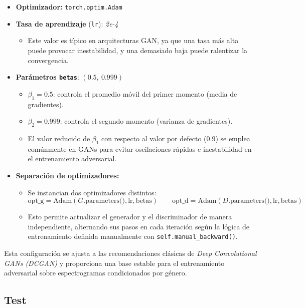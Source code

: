\begin{itemize}
    \item \textbf{Optimizador:} \texttt{torch.optim.Adam}
    \item \textbf{Tasa de aprendizaje} (\texttt{lr}): \textit{2e-4}
    \begin{itemize}
        \item Este valor es típico en arquitecturas GAN, ya que una tasa más alta puede provocar inestabilidad, y una demasiado baja puede ralentizar la convergencia.
    \end{itemize}
    \item \textbf{Parámetros \texttt{betas}}: $(0.5,\ 0.999)$
    \begin{itemize}
        \item $\beta_1 = 0.5$: controla el promedio móvil del primer momento (media de gradientes).
        \item $\beta_2 = 0.999$: controla el segundo momento (varianza de gradientes).
        \item El valor reducido de $\beta_1$ con respecto al valor por defecto (0.9) se emplea comúnmente en GANs para evitar oscilaciones rápidas e inestabilidad en el entrenamiento adversarial.
    \end{itemize}
    \item \textbf{Separación de optimizadores:}
    \begin{itemize}
        \item Se instancian dos optimizadores distintos:
        \[
        \text{opt\_g} = \text{Adam}(G.\text{parameters()}, \text{lr}, \text{betas})
        \qquad
        \text{opt\_d} = \text{Adam}(D.\text{parameters()}, \text{lr}, \text{betas})
        \]
        \item Esto permite actualizar el generador y el discriminador de manera independiente, alternando sus pasos en cada iteración según la lógica de entrenamiento definida manualmente con \texttt{self.manual\_backward()}.
    \end{itemize}
\end{itemize}

\noindent Esta configuración se ajusta a las recomendaciones clásicas de \textit{Deep Convolutional GANs (DCGAN)} y proporciona una base estable para el entrenamiento adversarial sobre espectrogramas condicionados por género.

\subsection{Test}

